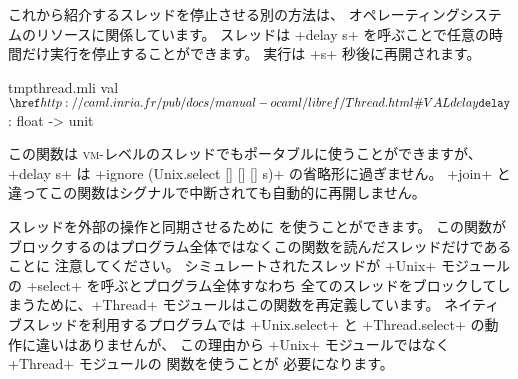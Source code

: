 これから紹介するスレッドを停止させる別の方法は、
オペレーティングシステムのリソースに関係しています。
スレッドは \ml+delay s+ を呼ぶことで任意の時間だけ実行を停止することができます。
実行は \ml+s+ 秒後に再開されます。
%
\begin{listingcodefile}{tmpthread.mli}
val $\indexlibvalue{Thread}{delay}$ : float -> unit
\end{listingcodefile}
%
この関数は \textsc{vm}-レベルのスレッドでもポータブルに使うことができますが、
\ml+delay s+ は \ml+ignore (Unix.select [] [] [] s)+ の省略形に過ぎません。
\ml+join+ と違ってこの関数はシグナルで中断されても自動的に再開しません。


スレッドを外部の操作と同期させるために  を使うことができます。
この関数がブロックするのはプログラム全体ではなくこの関数を読んだスレッドだけであることに
注意してください。
シミュレートされたスレッドが \ml+Unix+ モジュールの \ml+select+ を呼ぶとプログラム全体すなわち
全てのスレッドをブロックしてしまうために、\ml+Thread+ モジュールはこの関数を再定義しています。
ネイティブスレッドを利用するプログラムでは \ml+Unix.select+ と \ml+Thread.select+ の動作に違いはありませんが、
この理由から \ml+Unix+ モジュールではなく \ml+Thread+ モジュールの  関数を使うことが
必要になります。

